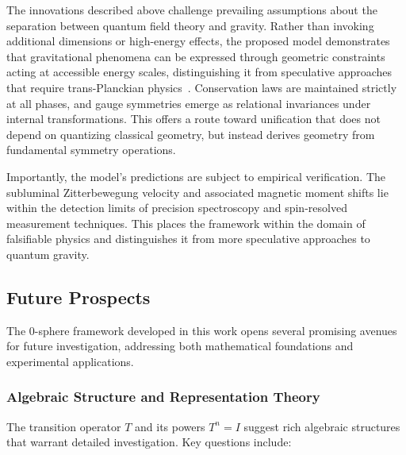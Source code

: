 \documentclass[%
 reprint,
 amsmath,amssymb,
 aps,
]{revtex4-1}
\numberwithin{equation}{section}%
\begin{document}
The innovations described above challenge prevailing assumptions about the separation between quantum field theory and gravity. Rather than invoking additional dimensions or high-energy effects, the proposed model demonstrates that gravitational phenomena can be expressed through geometric constraints acting at accessible energy scales, distinguishing it from speculative approaches that require trans-Planckian physics~\cite{amelino-camelia2002}. Conservation laws are maintained strictly at all phases, and gauge symmetries emerge as relational invariances under internal transformations. This offers a route toward unification that does not depend on quantizing classical geometry, but instead derives geometry from fundamental symmetry operations.

Importantly, the model's predictions are subject to empirical verification. The subluminal Zitterbewegung velocity and associated magnetic moment shifts lie within the detection limits of precision spectroscopy and spin-resolved measurement techniques. This places the framework within the domain of falsifiable physics and distinguishes it from more speculative approaches to quantum gravity.


\subsection{Future Prospects}
\label{subsec:future_prospects}

The 0-sphere framework developed in this work opens several promising avenues 
for future investigation, addressing both mathematical foundations and 
experimental applications.

\subsubsection{Algebraic Structure and Representation Theory}
\label{subsubsec:algebraic_structure}

The transition operator $T$ and its powers $T^n = I$ suggest rich algebraic 
structures that warrant detailed investigation. Key questions include:
\end{document}
